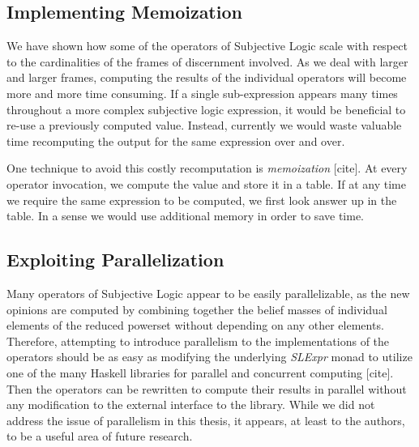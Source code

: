 \documentclass[thesis.tex]{subfiles}
\begin{document}
\subsection{Implementing Memoization}

We have shown how some of the operators of Subjective Logic scale with respect
to the cardinalities of the frames of discernment involved. As we deal with
larger and larger frames, computing the results of the individual operators
will become more and more time consuming. If a single sub-expression appears
many times throughout a more complex subjective logic expression, it would be
beneficial to re-use a previously computed value. Instead, currently we would waste
valuable time recomputing the output for the same expression over and over.

One technique to avoid this costly recomputation is \emph{memoization} [cite].
At every operator invocation, we compute the value and store it in a table. If at
any time we require the same expression to be computed, we first look answer up in
the table. In a sense we would use additional memory in order to save time.


\subsection{Exploiting Parallelization}

Many operators of Subjective Logic appear to be easily parallelizable,
as the new opinions are computed by combining together the belief
masses of individual elements of the reduced powerset without
depending on any other elements. Therefore, attempting to introduce
parallelism to the implementations of the operators should be as easy
as modifying the underlying \emph{SLExpr} monad to utilize one of the
many Haskell libraries for parallel and concurrent computing
[cite]. Then the operators can be rewritten to compute their results
in parallel without any modification to the external interface to the
library. While we did not address the issue of parallelism in this
thesis, it appears, at least to the authors, to be a useful area of
future research.
\end{document}
